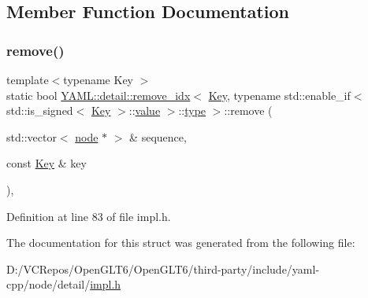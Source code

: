 \subsection{Member Function Documentation}
\mbox{\label{struct_y_a_m_l_1_1detail_1_1remove__idx_3_01_key_00_01typename_01std_1_1enable__if_3_01std_1_1is5b6d38b30a1fd839e13e20f486d53898_a8105d0e5afbddaf72c93c5d0b7ad9ed8}} 
\subsubsection{\texorpdfstring{remove()}{remove()}}
{\footnotesize\ttfamily template$<$typename Key $>$ \\
static bool \mbox{\hyperlink{struct_y_a_m_l_1_1detail_1_1remove__idx}{Y\+A\+M\+L\+::detail\+::remove\+\_\+idx}}$<$ \mbox{\hyperlink{namespace_y_a_m_l_a67c320aa50d3de7ecba1d0b8775dd684a1af533fc24b0311b8c4d5ac2870283aa}{Key}}, typename std\+::enable\+\_\+if$<$ std\+::is\+\_\+signed$<$ \mbox{\hyperlink{namespace_y_a_m_l_a67c320aa50d3de7ecba1d0b8775dd684a1af533fc24b0311b8c4d5ac2870283aa}{Key}} $>$\+::\mbox{\hyperlink{glad_8h_a03aff08f73d7fde3d1a08e0abd8e84fa}{value}} $>$\+::\mbox{\hyperlink{glad_8h_a890efa53b3d7deeeced6f3a0d6653ed3}{type}} $>$\+::remove (\begin{DoxyParamCaption}\item[{std\+::vector$<$ \mbox{\hyperlink{class_y_a_m_l_1_1detail_1_1node}{node}} $\ast$ $>$ \&}]{sequence,  }\item[{const \mbox{\hyperlink{namespace_y_a_m_l_a67c320aa50d3de7ecba1d0b8775dd684a1af533fc24b0311b8c4d5ac2870283aa}{Key}} \&}]{key }\end{DoxyParamCaption})\hspace{0.3cm}{\ttfamily [inline]}, {\ttfamily [static]}}



Definition at line 83 of file impl.\+h.



The documentation for this struct was generated from the following file\+:\begin{DoxyCompactItemize}
\item 
D\+:/\+V\+C\+Repos/\+Open\+G\+L\+T6/\+Open\+G\+L\+T6/third-\/party/include/yaml-\/cpp/node/detail/\mbox{\hyperlink{detail_2impl_8h}{impl.\+h}}\end{DoxyCompactItemize}
